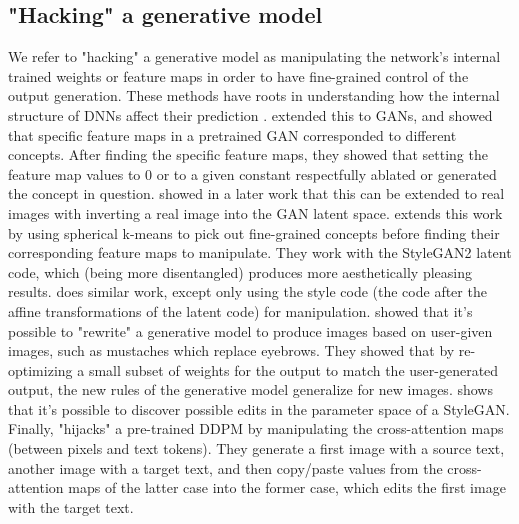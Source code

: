 \subsection{"Hacking" a generative model}\label{subsection:hacking_generative_model}
We refer to "hacking" a generative model as manipulating the network's internal trained weights 
or feature maps in order to have fine-grained control of the output generation. These methods 
have roots in understanding how the internal structure of \ac{DNN}s affect their prediction \citep{collins2018deep, zeiler2014visualizing, strobelt2017lstmvis, karpathy2015visualizing, chen2019delving}.
\cite{bau2018gan} extended this to \ac{GAN}s, and showed that specific feature maps in a pretrained \ac{GAN}
corresponded to different concepts. After finding the specific feature maps, they showed that setting 
the feature map values to 0 or to a given constant respectfully ablated or generated the concept 
in question. \cite{bau2020semantic} showed in a later work that this can be extended to real images 
with inverting a real image into the \ac{GAN} latent space. \cite{editing_style} extends this work 
by using spherical k-means to pick out fine-grained concepts before finding their corresponding feature maps 
to manipulate. They work with the StyleGAN2 latent code, which (being more disentangled) produces more 
aesthetically pleasing results. \cite{stylespace_analysis} does similar work, except only using the 
style code (the code after the affine transformations of the latent code) for manipulation. \cite{bau2020rewriting} 
showed that it's possible 
to "rewrite" a generative model to produce images based on user-given images, such as mustaches which 
replace eyebrows. They showed that by re-optimizing a small subset of weights for the output to match 
the user-generated output, the new rules of the generative model generalize for new images. 
\cite{cherepkov2021navigating} shows that it's possible to discover possible edits in the parameter
space of a StyleGAN.
Finally, 
\cite{hertz2022prompt} "hijacks" a pre-trained \ac{DDPM} by manipulating the cross-attention maps 
(between pixels and text tokens). They generate a first image with a source text, another image 
with a target text, and then copy/paste values from the cross-attention maps of the latter case into 
the former case, which edits the first image with the target text. 

